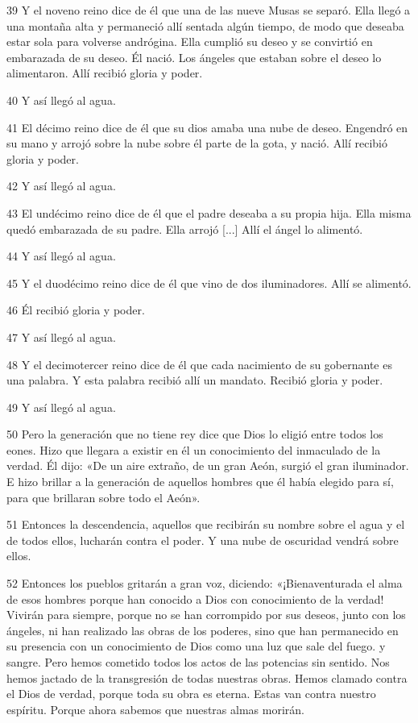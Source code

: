 \par 39 Y el noveno reino dice de él que una de las nueve Musas se separó. Ella llegó a una montaña alta y permaneció allí sentada algún tiempo, de modo que deseaba estar sola para volverse andrógina. Ella cumplió su deseo y se convirtió en embarazada de su deseo. Él nació. Los ángeles que estaban sobre el deseo lo alimentaron. Allí recibió gloria y poder.
\par 40 Y así llegó al agua.
\par 41 El décimo reino dice de él que su dios amaba una nube de deseo. Engendró en su mano y arrojó sobre la nube sobre él parte de la gota, y nació. Allí recibió gloria y poder.
\par 42 Y así llegó al agua.
\par 43 El undécimo reino dice de él que el padre deseaba a su propia hija. Ella misma quedó embarazada de su padre. Ella arrojó [...] Allí el ángel lo alimentó.
\par 44 Y así llegó al agua.

\par 45 Y el duodécimo reino dice de él que vino de dos iluminadores. Allí se alimentó.
\par 46 Él recibió gloria y poder.
\par 47 Y así llegó al agua.

\par 48 Y el decimotercer reino dice de él que cada nacimiento de su gobernante es una palabra. Y esta palabra recibió allí un mandato. Recibió gloria y poder.
\par 49 Y así llegó al agua.
\par 50 Pero la generación que no tiene rey dice que Dios lo eligió entre todos los eones. Hizo que llegara a existir en él un conocimiento del inmaculado de la verdad. Él dijo: «De un aire extraño, de un gran Aeón, surgió el gran iluminador. E hizo brillar a la generación de aquellos hombres que él había elegido para sí, para que brillaran sobre todo el Aeón».

\par 51 Entonces la descendencia, aquellos que recibirán su nombre sobre el agua y el de todos ellos, lucharán contra el poder. Y una nube de oscuridad vendrá sobre ellos.

\par 52 Entonces los pueblos gritarán a gran voz, diciendo: «¡Bienaventurada el alma de esos hombres porque han conocido a Dios con conocimiento de la verdad! Vivirán para siempre, porque no se han corrompido por sus deseos, junto con los ángeles, ni han realizado las obras de los poderes, sino que han permanecido en su presencia con un conocimiento de Dios como una luz que sale del fuego. y sangre. Pero hemos cometido todos los actos de las potencias sin sentido. Nos hemos jactado de la transgresión de todas nuestras obras. Hemos clamado contra el Dios de verdad, porque toda su obra es eterna. Estas van contra nuestro espíritu. Porque ahora sabemos que nuestras almas morirán.

